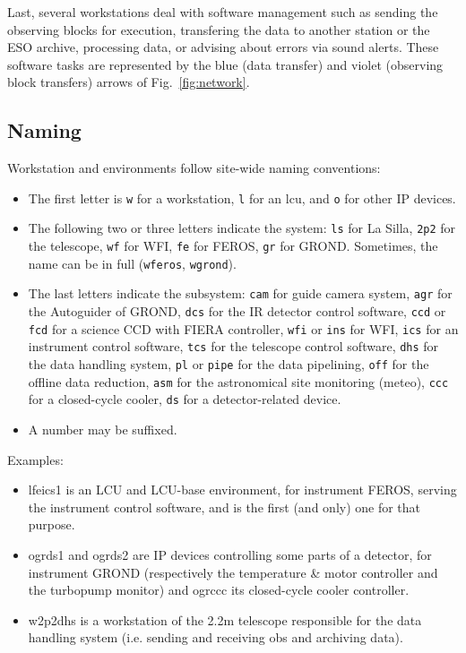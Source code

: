 \documentclass[11pt,fleqn,a4paper]{book}
\begin{document}
Last, several workstations deal with software management such as sending the observing blocks for execution, transfering the data to another station or the ESO archive, processing data, or advising about errors via sound alerts.  These software tasks are represented by the blue (data transfer) and violet (observing block transfers) arrows of Fig.~\ref{fig:network}.  

\subsection{Naming}
Workstation and environments follow site-wide naming conventions:
\begin{itemize}
    \item The first letter is \texttt{w} for a \gls{workstation}, \texttt{l} for an \gls{lcu}, and \texttt{o} for other IP devices.
    \item The following two or three letters indicate the system: \texttt{ls} for La Silla, \texttt{2p2} for the telescope, \texttt{wf} for WFI, \texttt{fe} for FEROS, \texttt{gr} for GROND. Sometimes, the name can be in full (\texttt{wferos}, \texttt{wgrond}).
    \item The last letters indicate the subsystem: \texttt{cam} for guide camera system, \texttt{agr} for the Autoguider of GROND, \texttt{dcs} for the IR detector control software, \texttt{ccd} or \texttt{fcd} for a science CCD with FIERA controller, \texttt{wfi} or \texttt{ins} for WFI, \texttt{ics} for an instrument control software, \texttt{tcs} for the telescope control software, \texttt{dhs} for the data handling system, \texttt{pl} or \texttt{pipe} for the data pipelining, \texttt{off} for the offline data reduction, \texttt{asm} for the  astronomical site monitoring (meteo), \texttt{ccc} for a closed-cycle cooler, \texttt{ds} for a detector-related device.
    \item A number may be suffixed.
\end{itemize}

Examples:
\begin{itemize}
\item \gls{lfeics1} is an LCU and LCU-base environment, for instrument FEROS, serving the instrument control software, and is the first (and only) one for that purpose. 
\item \gls{ogrds1} and \gls{ogrds2} are IP devices controlling some parts of a detector, for instrument GROND (respectively the temperature \& motor controller and the turbopump monitor) and \gls{ogrccc} its closed-cycle cooler controller.
\item \gls{w2p2dhs} is a workstation of the 2.2m telescope responsible for the data handling system (i.e. sending and receiving \glspl{ob} and archiving data). 
\end{itemize}
\end{document}
